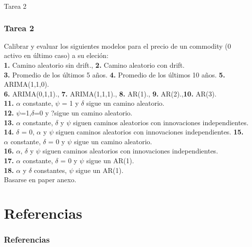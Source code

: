 \documentclass[spanish,xcolor=table]{beamer}
\begin{document}

\begin{section}{Tarea 2}
\begin{frame}
\frametitle{Tarea 2}
Calibrar y evaluar los siguientes modelos para el precio de un commodity (0 activo en \'ultimo caso) a su eleci\'on:\\
\textbf{1.} Camino aleatorio sin drift., \textbf{2.} Camino aleatorio con drift.\\
\textbf{3.} Promedio de los \'ultimos 5 a\~nos. \textbf{4.} Promedio de los \'ultimos 10 a\~nos. \textbf{5.} ARIMA(1,1,0).\\
\textbf{6.} ARIMA(0,1,1)., \textbf{7.} ARIMA(1,1,1)., \textbf{8.} AR(1)., \textbf{9.} AR(2).,\textbf{10.} AR(3).\\
\textbf{11.} $\alpha$ constante, $\psi$ = 1 y $\delta$ sigue un camino aleatorio.\\
\textbf{12.} $\psi$=1,$\delta$=0 y ?sigue un camino aleatorio.\\
\textbf{13.} $\alpha$ constante, $\delta$ y $\psi$ siguen caminos aleatorios con innovaciones independientes.\\
\textbf{14.} $\delta$ = 0, $\alpha$ y $\psi$ siguen caminos aleatorios con innovaciones independientes. 
\textbf{15.} $\alpha$ constante, $\delta$ = 0 y $\psi$ sigue un camino aleatorio.\\
\textbf{16.} $\alpha$, $\delta$ y $\psi$ siguen caminos aleatorios con innovaciones independientes.\\
\textbf{17.} $\alpha$ constante, $\delta$ = 0 y $\psi$ sigue un AR(1).\\
\textbf{18.} $\alpha$ y $\delta$ constantes, $\psi$ sigue un AR(1).\\
 \vspace{4mm}	
 Basarse en paper anexo.
\end{frame}
\end{section}

\section{Referencias}
\begin{frame}[allowframebreaks]
        \frametitle{Referencias}
        
        \nocite{} %
        
\end{frame}


\end{document}
